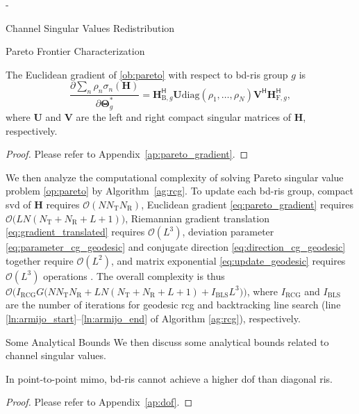 \begin{section}{-}
\begin{subsection}{Channel Singular Values Redistribution}
\begin{subsubsection}{Pareto Frontier Characterization}
			\begin{lemma}\label{lm:pareto_gradient}
				The Euclidean gradient of \eqref{ob:pareto} with respect to \gls{bd}-\gls{ris} group $g$ is
				\begin{equation}
					\frac{\partial \sum_n \rho_n \sigma_n(\mathbf{H})}{\partial \mathbf{\Theta}_g^*} = \mathbf{H}_{\mathrm{B},g}^\mathsf{H} \mathbf{U} \mathrm{diag}(\rho_1,\ldots,\rho_N) \mathbf{V}^\mathsf{H} \mathbf{H}_{\mathrm{F},g}^\mathsf{H},
					\label{eq:pareto_gradient}
				\end{equation}
				where $\mathbf{U}$ and $\mathbf{V}$ are the left and right compact singular matrices of $\mathbf{H}$, respectively.
			\end{lemma}
			\begin{proof}
				Please refer to Appendix~\ref{ap:pareto_gradient}.
			\end{proof}

			We then analyze the computational complexity of solving Pareto singular value problem \eqref{op:pareto} by Algorithm~\ref{ag:rcg}.
			To update each \gls{bd}-\gls{ris} group, compact \gls{svd} of $\mathbf{H}$ requires $\mathcal{O}(N N_\mathrm{T} N_\mathrm{R})$, Euclidean gradient \eqref{eq:pareto_gradient} requires $\mathcal{O}\bigl(L N (N_\mathrm{T}+N_\mathrm{R}+L+1) \bigr)$, Riemannian gradient translation \eqref{eq:gradient_translated} requires $\mathcal{O}(L^3)$, deviation parameter \eqref{eq:parameter_cg_geodesic} and conjugate direction \eqref{eq:direction_cg_geodesic} together require $\mathcal{O}(L^2)$, and matrix exponential \eqref{eq:update_geodesic} requires $\mathcal{O}(L^3)$ operations \cite{Moler2003}.
			The overall complexity is thus $\mathcal{O}\bigl(I_\text{RCG} G \bigl(N N_\mathrm{T} N_\mathrm{R} + L N (N_\mathrm{T}+N_\mathrm{R}+L+1) + I_\text{BLS} L^3\bigr)\bigr)$, where $I_\text{RCG}$ and $I_\text{BLS}$ are the number of iterations for geodesic \gls{rcg} and backtracking line search (line \ref{ln:armijo_start}--\ref{ln:armijo_end} of Algorithm \ref{ag:rcg}), respectively.
		\end{subsubsection}

		\begin{subsubsection}{Some Analytical Bounds}\label{sc:bounds}
			We then discuss some analytical bounds related to channel singular values.
			\begin{proposition}\label{pp:dof}
				In point-to-point \gls{mimo}, \gls{bd}-\gls{ris} cannot achieve a higher \gls{dof} than diagonal \gls{ris}.
			\end{proposition}
			\begin{proof}
				Please refer to Appendix~\ref{ap:dof}.
			\end{proof}


\end{subsubsection}
\end{subsection}
\end{section}
